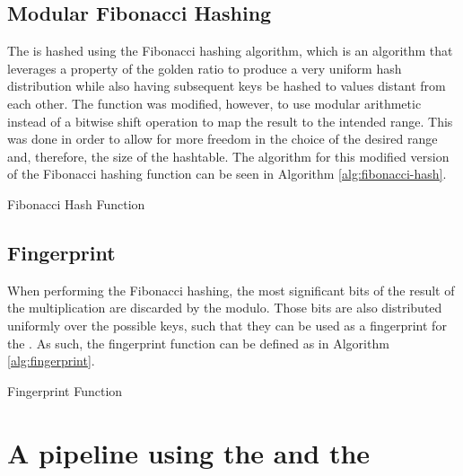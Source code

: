\subsection{Modular Fibonacci Hashing}

The \kmer is hashed using the Fibonacci hashing algorithm, which is an algorithm that leverages a property of the golden ratio
to produce a very uniform hash distribution while also having subsequent keys be hashed to values distant from each other. The
function was modified, however, to use modular arithmetic instead of a bitwise shift operation to map the result to the intended
range. This was done in order to allow for more freedom in the choice of the desired range and, therefore, the size of the
hashtable. The algorithm for this modified version of the Fibonacci hashing function can be seen in Algorithm \ref{alg:fibonacci-hash}.

\begin{algorithm}
  \caption{Fibonacci Hash Function}\label{alg:fibonacci-hash}
\end{algorithm}

\subsection{Fingerprint}

When performing the Fibonacci hashing, the most significant bits of the result of the multiplication are discarded by the modulo.
Those bits are also distributed uniformly over the possible keys, such that they can be used as a fingerprint for the \kmer.
As such, the fingerprint function can be defined as in Algorithm \ref{alg:fingerprint}. 

\begin{algorithm}
  \caption{Fingerprint Function}\label{alg:fingerprint}
\end{algorithm}

\section{A pipeline using the \dBCM and the \dBHT}


